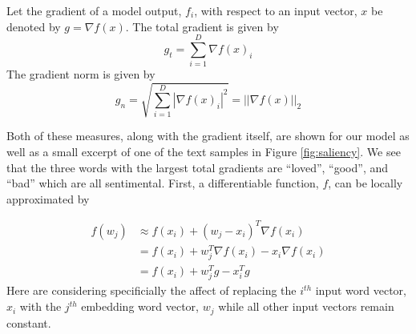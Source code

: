 \noindent
\begin{definition}
Let the gradient of a model output, $f_i$, with respect to an input vector, $x$ be denoted by $g=\nabla f(x)$.  The total gradient is given by 
\begin{equation}
g_t = \sum_{i=1}^D \nabla f(x)_i
\end{equation}
The gradient norm is given by 
\begin{equation}
g_n = \sqrt{\sum_{i=1}^D |\nabla f(x)_i|^2} = ||\nabla f(x)||_2
\end{equation}
\end{definition}

Both of these measures, along with the gradient itself, are shown for our model as well as a small excerpt of one of the text samples in Figure \ref{fig:saliency}.  We see that the three words with the largest total gradients are ``loved'', ``good'', and ``bad'' which are all sentimental.  First, a differentiable function, $f$, can be locally approximated by

\begin{align}
f(w_j) &\approx f(x_i) + (w_j-x_i)^T\nabla f(x_i) \\
     &= f(x_i) + w_j^T\nabla f(x_i) - x_i\nabla f(x_i) \\
     &= f(x_i) + w_j^Tg - x_i^Tg \label{approx}
\end{align}
Here are considering specificially the affect of replacing the $i^{th}$ input word vector, $x_i$ with the $j^{th}$ embedding word vector, $w_j$ while all other input vectors remain constant.

